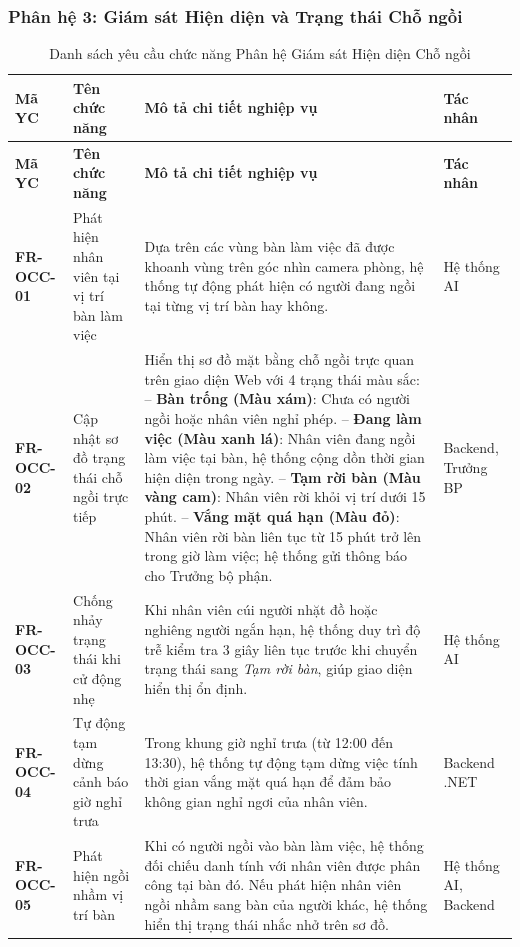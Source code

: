 \documentclass[12pt,a4paper]{article}
\begin{document}
\subsubsection{Phân hệ 3: Giám sát Hiện diện và Trạng thái Chỗ ngồi}

\begin{longtable}{|C{\tabcolsep\relax}|L{\tabcolsep\relax}|L{\tabcolsep\relax}|C{\tabcolsep\relax}|}
\caption{Danh sách yêu cầu chức năng Phân hệ Giám sát Hiện diện Chỗ ngồi}\\
\hline
{}
\textbf{Mã YC} & \textbf{Tên chức năng} & \textbf{Mô tả chi tiết nghiệp vụ} & \textbf{Tác nhân} \\
\hline
\endfirsthead
\hline
{}
\textbf{Mã YC} & \textbf{Tên chức năng} & \textbf{Mô tả chi tiết nghiệp vụ} & \textbf{Tác nhân} \\
\hline
\endhead
\textbf{FR-OCC-01} & Phát hiện nhân viên tại vị trí bàn làm việc & Dựa trên các vùng bàn làm việc đã được khoanh vùng trên góc nhìn camera phòng, hệ thống tự động phát hiện có người đang ngồi tại từng vị trí bàn hay không. & Hệ thống AI \\
\hline
{}
\textbf{FR-OCC-02} & Cập nhật sơ đồ trạng thái chỗ ngồi trực tiếp & Hiển thị sơ đồ mặt bằng chỗ ngồi trực quan trên giao diện Web với 4 trạng thái màu sắc:\newline
-- \textbf{Bàn trống (Màu xám)}: Chưa có người ngồi hoặc nhân viên nghỉ phép.\newline
-- \textbf{Đang làm việc (Màu xanh lá)}: Nhân viên đang ngồi làm việc tại bàn, hệ thống cộng dồn thời gian hiện diện trong ngày.\newline
-- \textbf{Tạm rời bàn (Màu vàng cam)}: Nhân viên rời khỏi vị trí dưới 15 phút.\newline
-- \textbf{Vắng mặt quá hạn (Màu đỏ)}: Nhân viên rời bàn liên tục từ 15 phút trở lên trong giờ làm việc; hệ thống gửi thông báo cho Trưởng bộ phận. & Backend, Trưởng BP \\
\hline
\textbf{FR-OCC-03} & Chống nhảy trạng thái khi cử động nhẹ & Khi nhân viên cúi người nhặt đồ hoặc nghiêng người ngắn hạn, hệ thống duy trì độ trễ kiểm tra 3 giây liên tục trước khi chuyển trạng thái sang \textit{Tạm rời bàn}, giúp giao diện hiển thị ổn định. & Hệ thống AI \\
\hline
{}
\textbf{FR-OCC-04} & Tự động tạm dừng cảnh báo giờ nghỉ trưa & Trong khung giờ nghỉ trưa (từ 12:00 đến 13:30), hệ thống tự động tạm dừng việc tính thời gian vắng mặt quá hạn để đảm bảo không gian nghỉ ngơi của nhân viên. & Backend .NET \\
\hline
\textbf{FR-OCC-05} & Phát hiện ngồi nhầm vị trí bàn & Khi có người ngồi vào bàn làm việc, hệ thống đối chiếu danh tính với nhân viên được phân công tại bàn đó. Nếu phát hiện nhân viên ngồi nhầm sang bàn của người khác, hệ thống hiển thị trạng thái nhắc nhở trên sơ đồ. & Hệ thống AI, Backend \\
\hline
\end{longtable}
\end{document}
